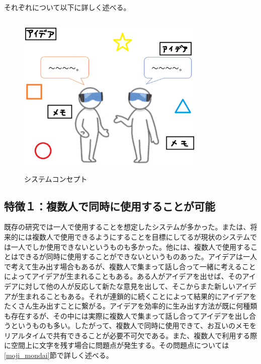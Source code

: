 \documentclass[11pt,a4j, titlepage]{jarticle} %
\begin{document}
それぞれについて以下に詳しく述べる。

\begin{figure}[H]
  \begin{center}
    \includegraphics[clip,height=8.0cm,width=9.0cm]{./concept.eps}
    \caption{システムコンセプト}
    \label{fig:concept}
  \end{center}
\end{figure}

\subsection*{特徴１：複数人で同時に使用することが可能}
既存の研究では一人で使用することを想定したシステムが多かった。または、将来的には複数人で使用できるようにすることを目標にしてるが現状のシステムでは一人でしか使用できないというものも多かった。他には、複数人で使用することはできるが同時に使用することができないというものあった。アイデアは一人で考えて生み出す場合もあるが、複数人で集まって話し合って一緒に考えることによってアイデアが生まれることもある。ある人がアイデアを出せば、そのアイデアに対して他の人が反応して新たな意見を出して、そこからまた新しいアイデアが生まれることもある。それが連鎖的に続くことによって結果的にアイデアをたくさん生み出すことに繋がる。アイデアを効率的に生み出す方法が既に何種類も存在するが、その中には実際に複数人で集まって話し合ってアイデアを出し合うというものも多い。したがって、複数人で同時に使用できて、お互いのメモをリアルタイムで共有できることが必要不可欠である。また、複数人で利用する際に空間上に文字を残す場合に問題点が発生する。その問題点については\ref{moji_mondai}節で詳しく述べる。
\end{document}
